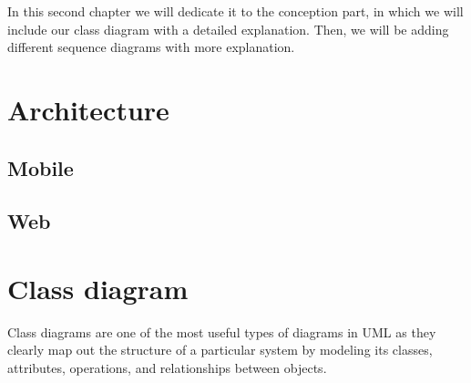 \documentclass[12pt,a4paper]{report}
\begin{document}
	In this second chapter we will dedicate it to the conception part, in which we will include our class diagram with a detailed explanation. Then, we will be adding different sequence diagrams with more explanation.
	\section{Architecture}
	\subsection{Mobile}
	\subsection{Web}
	
	
	\section{Class diagram}
	Class diagrams are one of the most useful types of diagrams in UML as they clearly map out the structure of a particular system by modeling its classes, attributes, operations, and relationships between objects.
	
\end{document}
